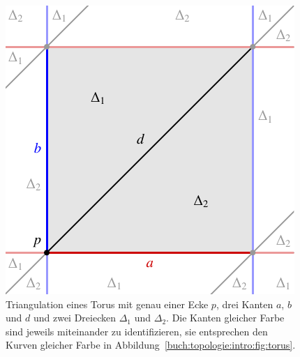 %
%
%
\begin{figure}
\centering
\includegraphics{chapters/120-topologie/images/torushomologie.pdf}
\caption{Triangulation eines Torus mit genau einer Ecke $p$, drei
Kanten $a$, $b$ und $d$ und zwei Dreiecken $\Delta_1$ und $\Delta_2$.
%
%
Die Kanten gleicher Farbe sind jeweils miteinander zu identifizieren,
sie entsprechen den Kurven gleicher Farbe in
%
Abbildung~\ref{buch:topologie:intro:fig:torus}.
\label{buch:topologie:euler:fig:torushomologie}}
\end{figure}
